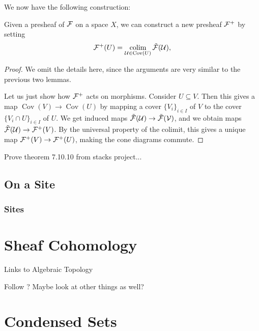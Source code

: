 \documentclass{article}
\DeclareMathOperator{\Cov}{Cov}
\DeclareMathOperator{\colim}{colim}
\begin{document}
We now have the following construction:
\begin{lemma}
    Given a presheaf of $\mathcal{F}$ on a space $X$, we can construct
    a new presheaf $\mathcal{F}^+$ by setting
    \begin{equation*}
        \mcF^+(U) = \colim_{\mcU \in \Cov(U)} \tilde{\mcF}(\mcU),
    \end{equation*}
\end{lemma}
\begin{proof}
    We omit the details here, since the arguments are very similar
    to the previous two lemmas.

    Let us just show how $\mathcal{F}^+$ acts on morphisms. Consider
    $U \subseteq V$. Then this gives a map $\Cov(V) \to \Cov(U)$
    by mapping a cover $\{V_i\}_{i\in I}$ of $V$ to the cover $\{V_i \cap U\}_{i\in I}$
    of $U$. We get induced maps $\tilde{\mathcal{F}}(\mathcal{U}) \to \tilde{\mathcal{F}}(\mathcal{V})$,
    and we obtain maps $\tilde{\mathcal{F}}(\mathcal{U}) \to \mathcal{F}^+(V)$.
    By the universal property of the colimit, this gives a unique map
    $\mathcal{F}^+(V) \to \mathcal{F}^+(U)$, making the cone diagrams commute.
\end{proof}

Prove theorem 7.10.10 from stacks project...

\subsection{On a Site}

\subsubsection{Sites}
\section{Sheaf Cohomology}
Links to Algebraic Topology

Follow \cite{Tu2022IntroductionSC}?
Maybe look at other things as well?
\section{Condensed Sets}


\end{document}
